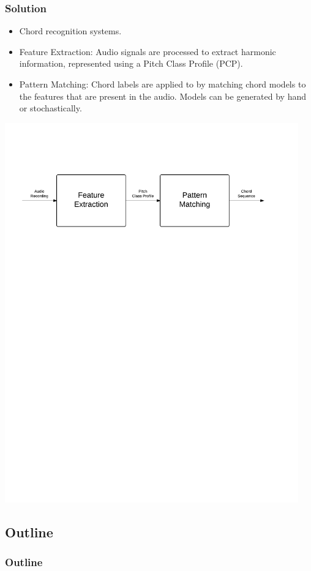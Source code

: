 \documentclass{beamer}
\begin{document}
\begin{frame}
	\frametitle{Solution}
	
	\begin{itemize}
		\item Chord recognition systems.
		\item Feature Extraction: Audio signals are processed to extract harmonic information, represented using a Pitch Class Profile (PCP).
		\item Pattern Matching: Chord labels are applied to  by matching chord models to the features that are present in the audio. Models can be generated by hand or stochastically.
	\end{itemize}
	\includegraphics[width=0.95\textwidth]{ChordRecognition.pdf}
\end{frame}

\subsection*{Outline}

\begin{frame}
  \frametitle{Outline}
  \tableofcontents[hideallsubsections]
\end{frame}
\end{document}
